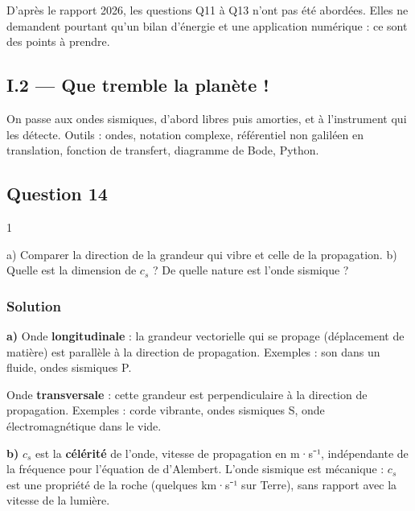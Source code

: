 \documentclass[11pt,a4paper]{article}
\begin{document}
\begin{jury}

D'après le rapport 2026, les questions Q11 à Q13 n'ont pas été abordées. Elles ne demandent pourtant qu'un bilan d'énergie et une application numérique : ce sont des points à prendre.

\end{jury}

\hypertarget{i.2-que-tremble-la-planuxe8te}{%
\subsection{I.2 --- Que tremble la planète !}\label{i.2-que-tremble-la-planuxe8te}}

On passe aux ondes sismiques, d'abord libres puis amorties, et à l'instrument qui les détecte. Outils : ondes, notation complexe, référentiel non galiléen en translation, fonction de transfert, diagramme de Bode, Python.

\hypertarget{question-14}{%
\subsection{Question 14}\label{question-14}}

\begin{indication}{1}

a) Comparer la direction de la grandeur qui vibre et celle de la propagation. b) Quelle est la dimension de \(c_s\) ? De quelle nature est l'onde sismique ?

\end{indication}

\hypertarget{solution-13}{%
\subsubsection{Solution}\label{solution-13}}

\textbf{a)} Onde \textbf{longitudinale} : la grandeur vectorielle qui se propage (déplacement de matière) est parallèle à la direction de propagation. Exemples : son dans un fluide, ondes sismiques P.

Onde \textbf{transversale} : cette grandeur est perpendiculaire à la direction de propagation. Exemples : corde vibrante, ondes sismiques S, onde électromagnétique dans le vide.

\textbf{b)} \(c_s\) est la \textbf{célérité} de l'onde, vitesse de propagation en m·s⁻¹, indépendante de la fréquence pour l'équation de d'Alembert. L'onde sismique est mécanique : \(c_s\) est une propriété de la roche (quelques km·s⁻¹ sur Terre), sans rapport avec la vitesse de la lumière.
\end{document}
